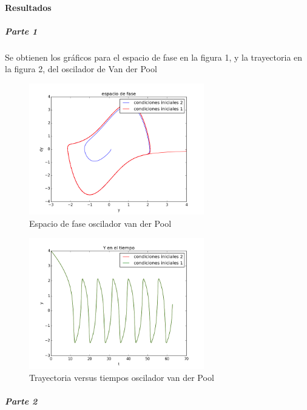 \documentclass[prl,showpacs, twocolumn]{revtex4-1}
\begin{document}
\bigskip
\bigskip

\paragraph{Resultados}
\subparagraph{Parte 1}

Se obtienen los gr\'aficos para el espacio de fase en la figura 1, y la trayectoria en la figura 2, del oscilador de Van der Pool

\begin{figure}[h!]
\begin{center}
\includegraphics[width=3in]{espaciofase.png}
\caption{ Espacio de fase oscilador van der Pool}
\label{}
\end{center}
\end{figure}

\begin{figure}[h!]
\begin{center}
\includegraphics[width=3in]{yeneltiempo.png}
\caption{ Trayectoria versus tiempos oscilador van der Pool}
\label{ }
\end{center}
\end{figure}


\subparagraph{Parte 2 }
\end{document}
